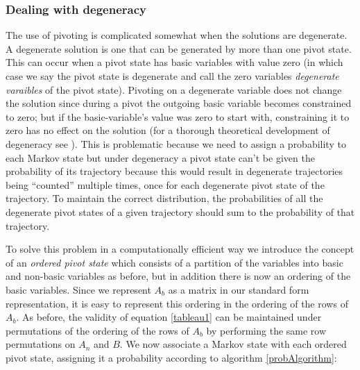 
\subsubsection{Dealing with degeneracy}

The use of pivoting is complicated somewhat when the solutions are degenerate. A degenerate solution is one that can be generated by more than one pivot state. This can occur when a pivot state has basic variables with value zero (in which case we say the pivot state is degenerate and call the zero variables \textit{degenerate varaibles} of the pivot state). Pivoting on a degenerate variable does not change the solution since during a pivot the outgoing basic variable becomes constrained to zero; but if the basic-variable's value was zero to start with, constraining it to zero has no effect on the solution (for a thorough theoretical development of degeneracy see \cite{zornig93degeneracy}). This is problematic because we need to assign a probability to each Markov state but under degeneracy a pivot state can't be given the probability of its trajectory because this would result in degenerate trajectories being ``counted'' multiple times, once for each degenerate pivot state of the trajectory. To maintain the correct distribution, the probabilities of all the degenerate pivot states of a given trajectory should sum to the probability of that trajectory.

To solve this problem in a computationally efficient way we introduce the concept of an \textit{ordered pivot state} which consists of a partition of the variables into basic and non-basic variables as before, but in addition there is now an ordering of the basic variables. Since we represent $A_b$ as a matrix in our standard form representation, it is easy to represent this ordering in the ordering of the rows of $A_b$. As before, the validity of equation \ref{tableau1} can be maintained under permutations of the ordering of the rows of $A_b$ by performing the same row permutations on $A_n$ and $B$. We now associate a Markov state with each ordered pivot state, assigning it a probability according to algorithm \ref{probAlgorithm}:

